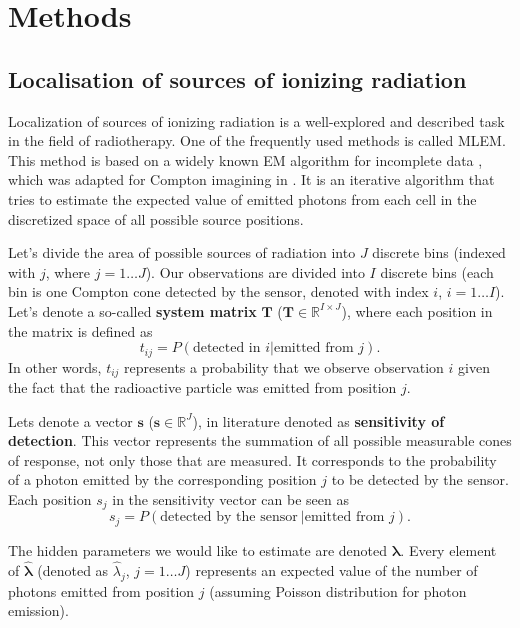 
\chapter{Methods}
\section{Localisation of sources of ionizing radiation}

Localization of sources of ionizing radiation is a well-explored and described task in the field of radiotherapy.
One of the frequently used methods is called \ac{MLEM}.
This method is based on a widely known EM algorithm for incomplete data \cite{EM}, which was adapted for Compton imagining in \cite{wilderman}.
It is an iterative algorithm that tries to estimate the expected value of emitted photons from each cell in the discretized space of all possible source positions.

Let's divide the area of possible sources of radiation into $J$ discrete bins (indexed with $j$, where $j = 1 \dotsc J$).
Our observations are divided into $I$ discrete bins (each bin is one Compton cone detected by the sensor, denoted with index $i$, $i = 1 \dotsc I$).
Let's denote a so-called \textbf{system matrix} $\mathbf{T}$ ($\mathbf{T} \in \mathbb{R}^{I \times J}$), where each position in the matrix is defined as
\begin{equation}
  t_{ij} =  P(\textrm{detected in } i | \textrm{emitted from } j).
\end{equation}
In other words, $t_{ij}$ represents a probability that we observe observation $i$ given the fact that the radioactive particle was emitted from position $j$.

Lets denote a vector $\mathbf{s}$ ($\mathbf{s} \in \mathbb{R}^{J}$), in literature denoted as \textbf{sensitivity of detection}.
This vector represents the summation of all possible measurable cones of response, not only those that are measured.
It corresponds to the probability of a photon emitted by the corresponding position $j$ to be detected by the sensor.
Each position $s_{j}$ in the sensitivity vector can be seen as 
\begin{equation}
  s_{j} =  P(\textrm{detected by the sensor}\ | \textrm{emitted from } j).
\end{equation}

The hidden parameters we would like to estimate are denoted $\bm{\hat{\lambda}}$.
Every element of $\bm{\hat{\lambda}}$ (denoted as $\hat{\lambda}_{j}$, $j = 1 \dotsc J$) represents an expected value of the number of photons emitted from position $j$ (assuming Poisson distribution for photon emission).


